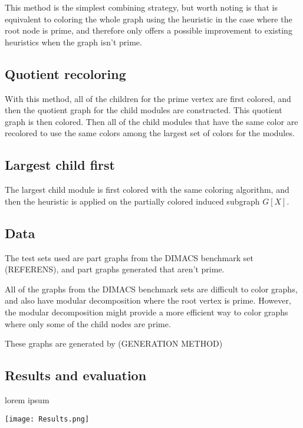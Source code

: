 \documentclass{amsart}
\theoremstyle{definition}
\begin{document}
This method is the simplest combining strategy, but worth noting is that is
equivalent to coloring the whole graph using the heuristic in the case where the
root node is prime, and therefore only offers a possible improvement to existing
heuristics when the graph isn't prime.

\subsection{Quotient recoloring}

With this method, all of the children for the prime vertex are first colored,
and then the quotient graph for the child modules are constructed. This quotient
graph is then colored. Then all of the child modules that have the same color
are recolored to use the same colors among the largest set of colors for the
modules.



\subsection{Largest child first}

The largest child module is first colored with the same coloring algorithm, and
then the heuristic is applied on the partially colored induced subgraph 
$G[X]$.


\subsection{Data}

The test sets used are part graphs from the DIMACS benchmark set (REFERENS), 
and part graphs generated that aren't prime.

All of the graphs from the DIMACS benchmark sets are difficult to color graphs,
and also have modular decomposition where the root vertex is prime. However, the
modular decomposition might provide a more efficient way to color graphs where
only some of the child nodes are prime. 

These graphs are generated by (GENERATION METHOD)

\subsection{Results and evaluation}

lorem ipsum

\texttt{[image: Results.png]}
\end{document}
